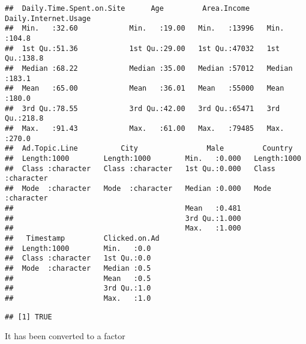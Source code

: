\documentclass[
]{article}
\newenvironment{Shaded}{\begin{snugshade}}{\end{snugshade}}
\newcommand{\CommentTok}[1]{\textcolor[rgb]{0.56,0.35,0.01}{\textit{#1}}}
\newcommand{\DocumentationTok}[1]{\textcolor[rgb]{0.56,0.35,0.01}{\textbf{\textit{#1}}}}
\newcommand{\FunctionTok}[1]{\textcolor[rgb]{0.00,0.00,0.00}{#1}}
\newcommand{\NormalTok}[1]{#1}
\newcommand{\OtherTok}[1]{\textcolor[rgb]{0.56,0.35,0.01}{#1}}
\newcommand{\SpecialCharTok}[1]{\textcolor[rgb]{0.00,0.00,0.00}{#1}}
\begin{document}
\begin{verbatim}
##  Daily.Time.Spent.on.Site      Age         Area.Income    Daily.Internet.Usage
##  Min.   :32.60            Min.   :19.00   Min.   :13996   Min.   :104.8       
##  1st Qu.:51.36            1st Qu.:29.00   1st Qu.:47032   1st Qu.:138.8       
##  Median :68.22            Median :35.00   Median :57012   Median :183.1       
##  Mean   :65.00            Mean   :36.01   Mean   :55000   Mean   :180.0       
##  3rd Qu.:78.55            3rd Qu.:42.00   3rd Qu.:65471   3rd Qu.:218.8       
##  Max.   :91.43            Max.   :61.00   Max.   :79485   Max.   :270.0       
##  Ad.Topic.Line          City                Male         Country         
##  Length:1000        Length:1000        Min.   :0.000   Length:1000       
##  Class :character   Class :character   1st Qu.:0.000   Class :character  
##  Mode  :character   Mode  :character   Median :0.000   Mode  :character  
##                                        Mean   :0.481                     
##                                        3rd Qu.:1.000                     
##                                        Max.   :1.000                     
##   Timestamp         Clicked.on.Ad
##  Length:1000        Min.   :0.0  
##  Class :character   1st Qu.:0.0  
##  Mode  :character   Median :0.5  
##                     Mean   :0.5  
##                     3rd Qu.:1.0  
##                     Max.   :1.0
\end{verbatim}

\begin{Shaded}
\end{Shaded}

\begin{Shaded}
\end{Shaded}

\begin{verbatim}
## [1] TRUE
\end{verbatim}

It has been converted to a factor
\end{document}

